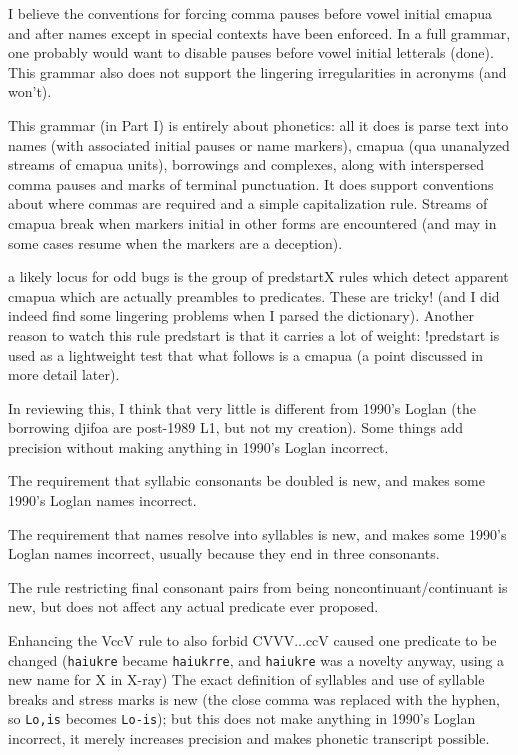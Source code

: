 \documentclass{article}
\begin{document}
I believe the conventions for forcing comma pauses before vowel initial cmapua and after names
except in special contexts have been enforced.  In a full grammar, one probably would want
to disable pauses before vowel initial letterals (done).  This grammar also does not support the lingering
irregularities in acronyms (and won't).

This grammar (in Part I) is entirely about phonetics:  all it does is parse text into names (with associated initial pauses or name markers), cmapua (qua unanalyzed streams of cmapua units), 
borrowings and complexes, along with interspersed comma pauses and marks
 of terminal punctuation.  It does support conventions about where commas are required
and a simple capitalization rule.  Streams of cmapua break when markers initial
 in other forms are encountered (and may in some cases resume when the markers
are a deception).

a likely locus for odd bugs is the group of predstartX rules which detect apparent cmapua which
are actually preambles to predicates.  These are tricky! (and I did indeed find some lingering
 problems when I parsed the dictionary).  Another reason to watch this rule predstart
is that it carries a lot of weight:  !predstart is used as a lightweight test that what follows is a cmapua (a point discussed in more detail later).

 In reviewing this, I think that very little is different from 1990's Loglan (the borrowing djifoa
 are post-1989 L1, but not my creation).  Some things add precision without making anything in 1990's Loglan incorrect.

 The requirement that syllabic consonants be doubled is new, and makes some 1990's Loglan names incorrect.

 The requirement that names resolve into syllables is new, and makes some 1990's Loglan names incorrect,
  usually because they end in three consonants.

 The rule restricting final consonant pairs from being noncontinuant/continuant is new, but
   does not affect any actual predicate ever proposed.

 Enhancing the VccV rule to also forbid CVVV...ccV caused one predicate to be changed
  ({\tt haiukre} became {\tt haiukrre}, and {\tt haiukre} was a novelty anyway, using a new name for X in X-ray)
 The exact definition of syllables and use of syllable breaks and stress marks is new (the close comma
  was replaced with the hyphen, so {\tt Lo,is} becomes {\tt Lo-is}); but this does not make anything in 1990's Loglan
  incorrect, it merely increases precision and makes phonetic transcript possible.
\end{document}
